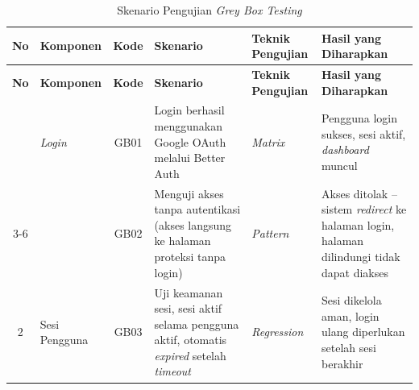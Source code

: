 	{\scriptsize
		\renewcommand{\arraystretch}{1.3}
		\begin{longtable}{|c|p{1.4cm}|c|p{2.4cm}|p{1.3cm}|p{1.9cm}|}
			\caption{Skenario Pengujian \textit{Grey Box Testing}}
			\label{tab:3.skenario-pengujian}                                                                                                                                                                                                                                                                                                                                \\
			\hline
			\textbf{No} & \textbf{Komponen}          & \textbf{Kode} & \textbf{Skenario}                                                                                                                     & \textbf{Teknik Pengujian}                      & \textbf{Hasil yang Diharapkan}                                                                              \\
			\hline
			\endfirsthead
			\hline
			\textbf{No} & \textbf{Komponen}          & \textbf{Kode} & \textbf{Skenario}                                                                                                                     & \textbf{Teknik Pengujian}                      & \textbf{Hasil yang Diharapkan}                                                                              \\
			\hline
			\endhead
			\hline
			\endfoot
			\hline
			\endlastfoot
			1           & \textit{Login}             & GB01          & Login berhasil menggunakan Google OAuth melalui Better Auth                                                                           & \textit{Matrix}                                & Pengguna login sukses, sesi aktif, \textit{dashboard} muncul                                                \\
			\cline{3-6}
			            &                            & GB02          & Menguji akses tanpa autentikasi (akses langsung ke halaman proteksi tanpa login)                                                      & \textit{Pattern}                               & Akses ditolak -- sistem \textit{redirect} ke halaman login, halaman dilindungi tidak dapat diakses          \\
			\hline
			2           & Sesi Pengguna              & GB03          & Uji keamanan sesi, sesi aktif selama pengguna aktif, otomatis \textit{expired} setelah \textit{timeout}                               & \textit{Regression}                            & Sesi dikelola aman, login ulang diperlukan setelah sesi berakhir                                            \\

\end{longtable}}

